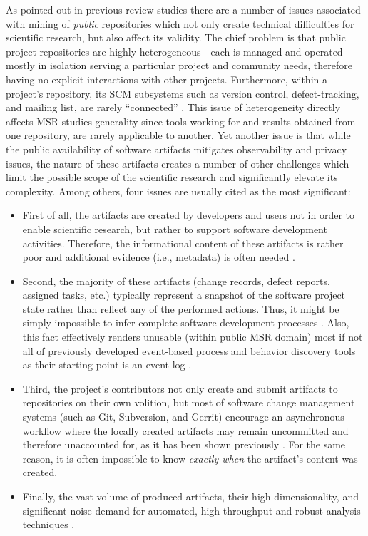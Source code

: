 As pointed out in previous review studies \cite{citeulike:12550438} \cite{citeulike:7853299} \cite{citeulike:7465518} there
are a number of issues associated with mining of \textit{public} repositories which not only create technical difficulties for 
scientific research, but also affect its validity. 
The chief problem is that public project repositories are highly heterogeneous - each is managed and operated 
mostly in isolation serving a particular project and community needs, therefore having no explicit interactions with 
other projects. 
Furthermore, within a project's repository, its SCM subsystems such as version control, defect-tracking, and mailing list, 
are rarely ``connected''  \cite{citeulike:13058334}. 
This issue of heterogeneity directly affects MSR studies generality since tools working for and results obtained from 
one repository, are rarely applicable to another.
Yet another issue is that while the public availability of software artifacts mitigates observability and privacy issues, 
the nature of these artifacts creates a number of other challenges which limit the possible scope of the scientific 
research and significantly elevate its complexity. Among others, four issues are usually cited as the most significant:
\begin{itemize}
 \item First of all, the artifacts are created by developers and users not in order to enable scientific research,
but rather to support software development activities. Therefore, the informational content of these artifacts is rather 
poor and additional evidence (i.e., metadata) is often needed \cite{citeulike:342840} \cite{citeulike:7954249} 
\cite{citeulike:7260421}.
 \item Second, the majority of these artifacts (change records, defect reports, assigned tasks, etc.) 
typically represent a snapshot of the software project state rather than reflect any of the performed actions.
Thus, it might be simply impossible to infer complete software development processes \cite{citeulike:1296888}.
Also, this fact effectively renders unusable (within public MSR domain) most if not all of previously developed 
event-based process and behavior discovery tools as their starting point is an event log \cite{citeulike:12944447}.
 \item Third, the project's contributors not only create and submit artifacts to repositories on their own volition,
but most of software change management systems (such as Git, Subversion, and Gerrit) encourage an asynchronous workflow 
where the locally created artifacts may remain uncommitted and therefore unaccounted for, as it has been shown previously
\cite{citeulike:2280690} \cite{citeulike:9037939}. 
For the same reason, it is often impossible to know \textit{exactly when} the artifact's content was created.
 \item Finally, the vast volume of produced artifacts, their high dimensionality, and significant noise demand 
 for automated, high throughput and robust analysis techniques 
 \cite{citeulike:12550438} \cite{citeulike:7853299} \cite{citeulike:4534888} \cite{citeulike:7549051}.
\end{itemize}

